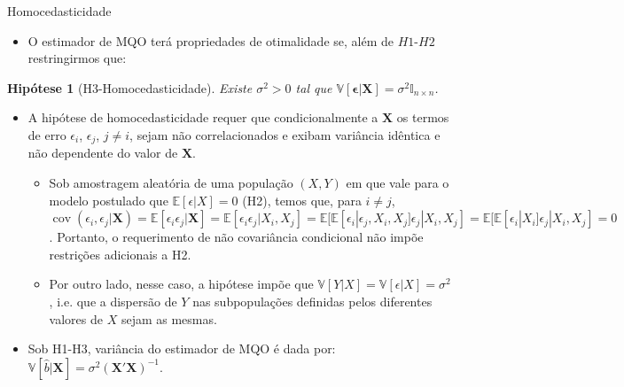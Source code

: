 \documentclass[11pt]{beamer}
\newtheorem{assumption}{Hipótese}
\begin{document}
\begin{frame}{Homocedasticidade}
	\begin{itemize}
		\item O estimador de MQO terá propriedades de otimalidade se, além de $H1$-$H2$ restringirmos que:
	\end{itemize}
	\begin{assumption}[H3-Homocedasticidade]
		Existe $\sigma^2 > 0$ tal que $\mathbb{V}[\boldsymbol{\epsilon}|\boldsymbol{X}] = \sigma^2 \mathbb{I}_{n\times n}$.
	\end{assumption}
	\begin{itemize}
		\item A hipótese de homocedasticidade requer que condicionalmente a $\boldsymbol{X}$ os termos de erro $\epsilon_i$, $\epsilon_j$, $j \neq i$, sejam não correlacionados e exibam variância idêntica {\color{red}e não dependente do valor de $\boldsymbol{X}$}.
		\begin{itemize}
			\item Sob  amostragem aleatória de uma população $(X,Y)$ em que vale para o modelo postulado que $\mathbb{E}[\epsilon|X]=0$ (H2), temos que, para $i\neq j$, $\operatorname{cov}(\epsilon_i,\epsilon_j|\boldsymbol{X}) = \mathbb{E}[\epsilon_i\epsilon_j|\boldsymbol{X}]  =\mathbb{E}[\epsilon_i\epsilon_j|X_i, X_j] = \mathbb{E}[\mathbb{E}[\epsilon_i|\epsilon_j, X_i, X_j]\epsilon_j|X_i, X_j] =    \mathbb{E}[\mathbb{E}[\epsilon_i|X_i]\epsilon_j|X_i, X_j] = 0$. Portanto, o requerimento de não covariância condicional não impõe restrições adicionais a H2.
			\item Por outro lado, nesse caso, a hipótese impõe que $\mathbb{V}[Y|X] =\mathbb{V}[\epsilon|X] = \sigma^2$, i.e. que a dispersão de $Y$ nas subpopulações definidas pelos diferentes valores de $X$ sejam as mesmas.
		\end{itemize}
\item Sob H1-H3, variância do estimador de MQO é dada por: $\mathbb{V}[\hat{b}|\boldsymbol{X}]= \sigma^2 (\boldsymbol{X}'\boldsymbol{X})^{-1}$.
	\end{itemize}
\end{frame}
\end{document}

